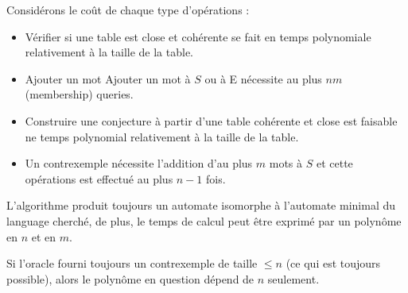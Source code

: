 Considérons le coût de chaque type d'opérations :
\begin{itemize}
	\item Vérifier si une table est close et cohérente se fait en temps polynomiale relativement à la taille de la table.
	\item Ajouter un mot  Ajouter un mot à $S$ ou à E nécessite au plus $nm$ (membership) queries.
	\item Construire une conjecture à partir d'une table cohérente et close est faisable ne temps polynomial relativement à
	      la taille de la table.
	\item Un contrexemple nécessite l'addition d'au plus $m$ mots à $S$ et cette opérations est effectué au plus $n-1$ fois.
\end{itemize}

\begin{theorem}
	L'algorithme produit toujours un automate isomorphe à l'automate minimal du language cherché, de plus, le temps de calcul peut être
	exprimé par un polynôme en $n$ et en $m$.
\end{theorem}

\begin{remarque}
	Si l'oracle fourni toujours un contrexemple de taille $\leq n$ (ce qui est toujours possible), alors le polynôme en question dépend de $n$ seulement.
\end{remarque}
